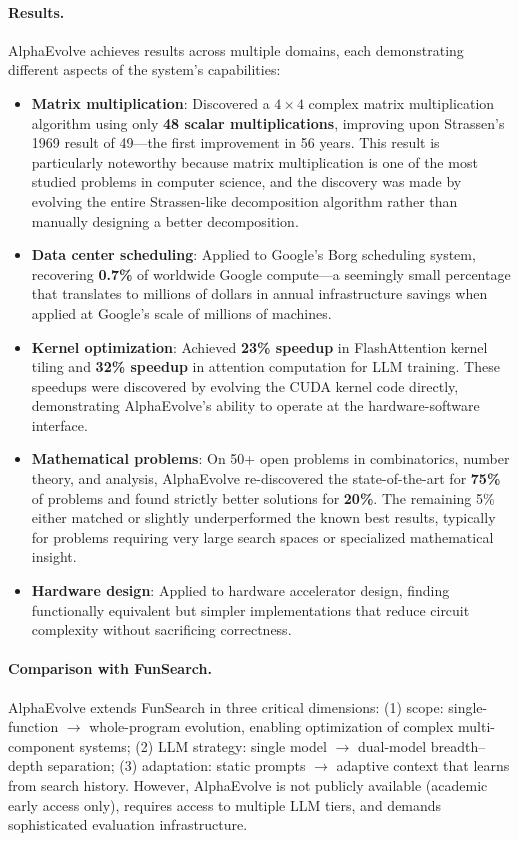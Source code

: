 \paragraph{Results.}
AlphaEvolve achieves results across multiple domains, each demonstrating different aspects of the system's capabilities:
\begin{itemize}
    \item \textbf{Matrix multiplication}: Discovered a $4 \times 4$ complex matrix multiplication algorithm using only \textbf{48 scalar multiplications}, improving upon Strassen's 1969 result of 49---the first improvement in 56 years. This result is particularly noteworthy because matrix multiplication is one of the most studied problems in computer science, and the discovery was made by evolving the entire Strassen-like decomposition algorithm rather than manually designing a better decomposition.
    \item \textbf{Data center scheduling}: Applied to Google's Borg scheduling system, recovering \textbf{0.7\%} of worldwide Google compute---a seemingly small percentage that translates to millions of dollars in annual infrastructure savings when applied at Google's scale of millions of machines.
    \item \textbf{Kernel optimization}: Achieved \textbf{23\% speedup} in FlashAttention kernel tiling and \textbf{32\% speedup} in attention computation for LLM training. These speedups were discovered by evolving the CUDA kernel code directly, demonstrating AlphaEvolve's ability to operate at the hardware-software interface.
    \item \textbf{Mathematical problems}: On 50+ open problems in combinatorics, number theory, and analysis, AlphaEvolve re-discovered the state-of-the-art for \textbf{75\%} of problems and found strictly better solutions for \textbf{20\%}. The remaining 5\% either matched or slightly underperformed the known best results, typically for problems requiring very large search spaces or specialized mathematical insight.
    \item \textbf{Hardware design}: Applied to hardware accelerator design, finding functionally equivalent but simpler implementations that reduce circuit complexity without sacrificing correctness.
\end{itemize}

\paragraph{Comparison with FunSearch.}
AlphaEvolve extends FunSearch in three critical dimensions: (1) scope: single-function $\rightarrow$ whole-program evolution, enabling optimization of complex multi-component systems; (2) LLM strategy: single model $\rightarrow$ dual-model breadth--depth separation; (3) adaptation: static prompts $\rightarrow$ adaptive context that learns from search history. However, AlphaEvolve is not publicly available (academic early access only), requires access to multiple LLM tiers, and demands sophisticated evaluation infrastructure.



